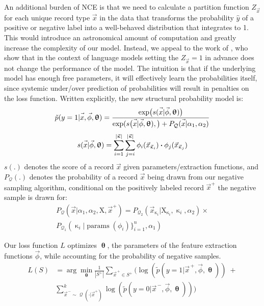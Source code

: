 \documentclass{article}
\newcommand{\vect}[1]{\vec{#1}}
\DeclareMathOperator{\q}{{\mathcal{Q}}}
\newcommand{\dotp}{\boldsymbol{\cdot} }
\begin{document}
An additional burden of NCE is that we need to calculate a partition function $Z_{\vec{x}}$ for each unique record type $\vec{x}$ in the data that transforms the probability $\hat y$ of a positive or negative label into a well-behaved distribution that integrates to 1.
This would introduce an astronomical amount of computation and greatly increase the complexity of our model.
Instead, we appeal to the work of \citet{fastnnlang},
who show that in the context of language models setting the $Z_{\vec{x}}=1$ in advance does not change the performance of the model.
The intuition is that if the underlying model has enough free parameters, it will effectively learn the probabilities itself, since systemic under/over prediction of probabilities will result in penalties on the loss function.
Written explicitly, the new structural probability model is:
\begin{equation}
\tilde p(y=1|\vec{x\vphantom{phi}},\vec{\phi}, \bm\uptheta) = \frac{\exp\bigl(s(\vec{x\vphantom{phi}}|\vec{\phi}, \bm\uptheta) \bigr)}{\exp( s\bigl(\vec{x\vphantom{phi}}|\vec{\phi}, \bm\uptheta), \bigr) + P_{\q}(\vec{\vphantom{phi}x}| \alpha_1,\alpha_2)}
\end{equation}
\begin{equation}
s(\vec{x\vphantom{phi}}|\vec{\phi}, \bm\uptheta) =
                       \sum_{i =1}^{|\vect{\upkappa}|} \sum_{j=i}^{|\vect{\upkappa}|}   \phi_i( \vect{x}_{\vect{\upkappa}_i}) \dotp \phi_j( \vect{x}_{\vect{\upkappa}_j})
\end{equation}
$s(.)$ denotes the score of a record $\vec{x}$ given parameters/extraction functions,
and $P_{\q}(.)$ denotes the probability of a record $\vec{x}$ being drawn from our negative sampling algorithm, conditional on the positively labeled record $\vect{x}^+$ the negative sample is drawn for:
\begin{align*}
P_{\q}(\vec{x}|\alpha_1,\alpha_2,\mathrm{X},\vect{x}^+) = P_{\q_2}(\vec{x}_{\upkappa_i}|\mathrm{X}_{\upkappa_i},\upkappa_i,\alpha_2)\times \\ P_{\q_1}(\upkappa_i|\operatorname{params}(\phi_i)\}_{i=1}^n,\alpha_1)
\end{align*}

Our loss function $L$ optimizes $\bm\uptheta$, the parameters of the feature extraction functions $\vect\phi$, while accounting for the probability of negative samples.
\begin{align*}
L(S) & = \arg\min_{\bm\uptheta}   \frac{1}{|S^+|} \sum_{\vect{x}^{\,+} \in S^+} \Big(\log(\tilde p(y=1|\vect{x}^{\,+},\vec{\phi},\bm\uptheta   ) ) \; + \\
&  \sum_{\vect{x}^{\,-}  \sim \q(\cdot|\vect{x}^+)}^k \log(\tilde p(y=0|\vect{x}^{\,-},\vec{\phi},\bm\uptheta   )) \Big)
\end{align*}
\end{document}
